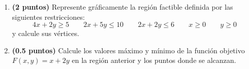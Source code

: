 
\begin{enumerate}[label=\alph*)]
\item \textbf{(2 puntos)} Represente gráficamente la región factible definida por las siguientes restricciones:
\[
4x+2y\geq5\qquad2x+5y\leq10\qquad2x+2y\leq6\qquad x\geq0\qquad y\geq0
\]
y calcule sus vértices.
\item \textbf{(0.5 puntos)} Calcule los valores máximo y mínimo de la función objetivo $F(x,y)=x+2y$ en la región anterior y los puntos donde se alcanzan.
\end{enumerate}
